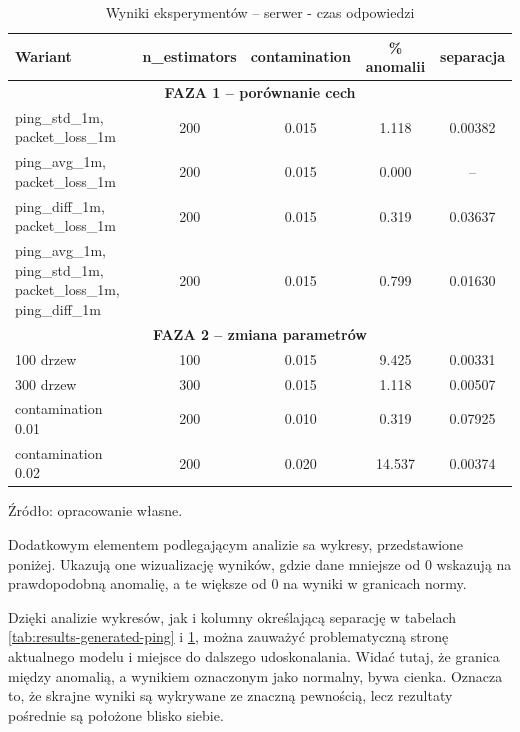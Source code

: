 \begin{table}[H]
	\centering
	\caption{Wyniki eksperymentów – serwer - czas odpowiedzi}
	\label{tab:results-server-ping}
	\vspace{10pt}
	
	\begin{tabular}{lcccc}
		\toprule
		Wariant & n\_estimators & contamination & \% anomalii & separacja \\
		\midrule
		
		\multicolumn{5}{c}{\textbf{FAZA 1 – porównanie cech}} \\
		\midrule
		ping\_std\_1m, packet\_loss\_1m & 200 & 0.015 & 1.118 & 0.00382 \\
		ping\_avg\_1m, packet\_loss\_1m & 200 & 0.015 & 0.000 & -- \\
		ping\_diff\_1m, packet\_loss\_1m & 200 & 0.015 & 0.319 & 0.03637 \\
		\makecell[l]{ping\_avg\_1m, ping\_std\_1m,\\packet\_loss\_1m, ping\_diff\_1m} & 200 & 0.015 & 0.799 & 0.01630 \\
		
		\midrule
		\multicolumn{5}{c}{\textbf{FAZA 2 – zmiana parametrów}} \\
		\midrule
		100 drzew & 100 & 0.015 & 9.425 & 0.00331 \\
		300 drzew & 300 & 0.015 & 1.118 & 0.00507 \\
		contamination 0.01 & 200 & 0.010 & 0.319 & 0.07925 \\
		contamination 0.02 & 200 & 0.020 & 14.537 & 0.00374 \\
		
		\bottomrule
	\end{tabular}
	
	\vspace{10pt}
	\small Źródło: opracowanie własne.
\end{table}

Dodatkowym elementem podlegającym analizie sa wykresy, przedstawione poniżej. Ukazują one wizualizację wyników, gdzie dane mniejsze od 0 wskazują na prawdopodobną anomalię, a te większe od 0 na wyniki w granicach normy.

Dzięki analizie wykresów, jak i kolumny określającą separację w tabelach \ref{tab:results-generated-ping} i \ref{tab:results-server-ping}, można zauważyć problematyczną stronę aktualnego modelu i miejsce do dalszego udoskonalania. Widać tutaj, że granica między anomalią, a wynikiem oznaczonym jako normalny, bywa cienka. Oznacza to, że skrajne wyniki są wykrywane ze znaczną pewnością, lecz rezultaty pośrednie są położone blisko siebie.

